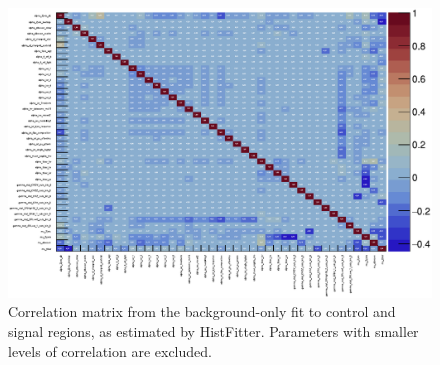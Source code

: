 \begin{figure}[tp]
\centering
\includegraphics[width=\textwidth]{figures/2ljets_fit_corrmatrix.pdf}
\caption[
Correlation matrix from the background-only fit to control and signal regions
]{%
Correlation matrix from the background-only fit to control and signal regions,
as estimated by HistFitter.
Parameters with smaller levels of correlation are excluded.
}
\label{fig:2ljets_fit_corrmatrix}
\end{figure}

